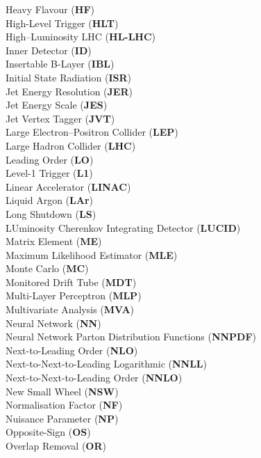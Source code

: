 Heavy Flavour (\textbf{HF}) \\
High-Level Trigger (\textbf{HLT}) \\
High–Luminosity LHC (\textbf{HL-LHC}) \\
Inner Detector (\textbf{ID}) \\
Insertable B-Layer (\textbf{IBL}) \\
Initial State Radiation (\textbf{ISR}) \\
Jet Energy Resolution (\textbf{JER}) \\
Jet Energy Scale (\textbf{JES}) \\
Jet Vertex Tagger (\textbf{JVT}) \\
Large Electron–Positron Collider (\textbf{LEP}) \\
Large Hadron Collider (\textbf{LHC}) \\
Leading Order (\textbf{LO}) \\
Level-1 Trigger (\textbf{L1}) \\
Linear Accelerator (\textbf{LINAC}) \\
Liquid Argon (\textbf{LAr}) \\
Long Shutdown (\textbf{LS}) \\
LUminosity Cherenkov Integrating Detector (\textbf{LUCID}) \\
Matrix Element (\textbf{ME}) \\
Maximum Likelihood Estimator (\textbf{MLE}) \\
Monte Carlo (\textbf{MC}) \\
Monitored Drift Tube (\textbf{MDT}) \\
Multi-Layer Perceptron (\textbf{MLP}) \\
Multivariate Analysis (\textbf{MVA}) \\
Neural Network (\textbf{NN}) \\
Neural Network Parton Distribution Functions (\textbf{NNPDF}) \\
Next-to-Leading Order (\textbf{NLO}) \\
Next-to-Next-to-Leading Logarithmic (\textbf{NNLL}) \\
Next-to-Next-to-Leading Order (\textbf{NNLO}) \\
New Small Wheel (\textbf{NSW}) \\
Normalisation Factor (\textbf{NF}) \\
Nuisance Parameter (\textbf{NP}) \\
Opposite-Sign (\textbf{OS}) \\
Overlap Removal (\textbf{OR}) \\
